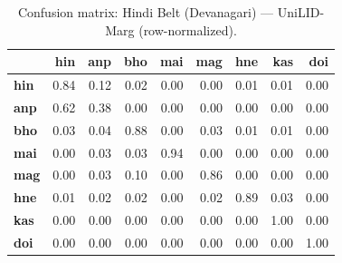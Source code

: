 \begin{table}[htbp]
\centering
\small
\begin{tabular}{lrrrrrrrr}
\toprule
 & \textbf{hin} & \textbf{anp} & \textbf{bho} & \textbf{mai} & \textbf{mag} & \textbf{hne} & \textbf{kas} & \textbf{doi} \\
\midrule
\textbf{hin} & \cellcolor{blue!83}\color{white}0.84 & \cellcolor{blue!11}0.12 & \cellcolor{blue!1}0.02 & \cellcolor{blue!0}0.00 & \cellcolor{blue!0}0.00 & \cellcolor{blue!0}0.01 & \cellcolor{blue!1}0.01 & \cellcolor{blue!0}0.00 \\
\textbf{anp} & \cellcolor{blue!62}\color{white}0.62 & \cellcolor{blue!37}0.38 & \cellcolor{blue!0}0.00 & \cellcolor{blue!0}0.00 & \cellcolor{blue!0}0.00 & \cellcolor{blue!0}0.00 & \cellcolor{blue!0}0.00 & \cellcolor{blue!0}0.00 \\
\textbf{bho} & \cellcolor{blue!2}0.03 & \cellcolor{blue!4}0.04 & \cellcolor{blue!87}\color{white}0.88 & \cellcolor{blue!0}0.00 & \cellcolor{blue!2}0.03 & \cellcolor{blue!1}0.01 & \cellcolor{blue!1}0.01 & \cellcolor{blue!0}0.00 \\
\textbf{mai} & \cellcolor{blue!0}0.00 & \cellcolor{blue!3}0.03 & \cellcolor{blue!3}0.03 & \cellcolor{blue!93}\color{white}0.94 & \cellcolor{blue!0}0.00 & \cellcolor{blue!0}0.00 & \cellcolor{blue!0}0.00 & \cellcolor{blue!0}0.00 \\
\textbf{mag} & \cellcolor{blue!0}0.00 & \cellcolor{blue!3}0.03 & \cellcolor{blue!10}0.10 & \cellcolor{blue!0}0.00 & \cellcolor{blue!86}\color{white}0.86 & \cellcolor{blue!0}0.00 & \cellcolor{blue!0}0.00 & \cellcolor{blue!0}0.00 \\
\textbf{hne} & \cellcolor{blue!1}0.01 & \cellcolor{blue!2}0.02 & \cellcolor{blue!2}0.02 & \cellcolor{blue!0}0.00 & \cellcolor{blue!2}0.02 & \cellcolor{blue!88}\color{white}0.89 & \cellcolor{blue!3}0.03 & \cellcolor{blue!0}0.00 \\
\textbf{kas} & \cellcolor{blue!0}0.00 & \cellcolor{blue!0}0.00 & \cellcolor{blue!0}0.00 & \cellcolor{blue!0}0.00 & \cellcolor{blue!0}0.00 & \cellcolor{blue!0}0.00 & \cellcolor{blue!100}\color{white}1.00 & \cellcolor{blue!0}0.00 \\
\textbf{doi} & \cellcolor{blue!0}0.00 & \cellcolor{blue!0}0.00 & \cellcolor{blue!0}0.00 & \cellcolor{blue!0}0.00 & \cellcolor{blue!0}0.00 & \cellcolor{blue!0}0.00 & \cellcolor{blue!0}0.00 & \cellcolor{blue!100}\color{white}1.00 \\
\bottomrule
\end{tabular}
\caption{Confusion matrix: Hindi Belt (Devanagari) — UniLID-Marg (row-normalized).}
\label{tab:cm-hindi_belt-unilid-marg}
\end{table}

